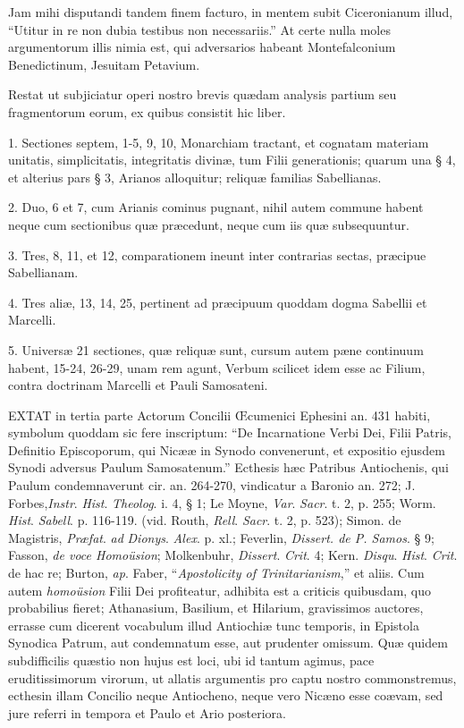 Jam mihi disputandi tandem
finem facturo, in mentem subit Ciceronianum illud, ``Utitur in re non
dubia testibus non necessariis.'' At certe nulla moles argumentorum
illis nimia est, qui adversarios habeant Montefalconium Benedictinum,
Jesuitam Petavium.

Restat
ut subjiciatur operi nostro brevis quædam analysis partium seu
fragmentorum eorum, ex quibus consistit hic liber.

1.
Sectiones septem, 1-5, 9, 10, Monarchiam tractant, et cognatam
materiam unitatis, simplicitatis, integritatis divinæ, tum Filii
generationis; quarum una § 4, et alterius pars § 3, Arianos
alloquitur; reliquæ familias Sabellianas.

2.
Duo, 6 et 7, cum Arianis cominus pugnant, nihil autem commune habent
neque cum sectionibus quæ præcedunt, neque cum iis quæ subsequuntur.

3.
Tres, 8, 11, et 12, comparationem ineunt inter contrarias sectas, præcipue
Sabellianam.

4.
Tres aliæ, 13, 14, 25, pertinent ad præcipuum quoddam dogma Sabellii
et Marcelli.

5.
Universæ 21 sectiones, quæ reliquæ sunt, cursum autem pæne
continuum habent, 15-24, 26-29, unam rem agunt, Verbum scilicet idem
esse ac Filium, contra doctrinam Marcelli et Pauli Samosateni.


EXTAT
in tertia parte Actorum Concilii Œcumenici Ephesini an. 431 habiti,
symbolum quoddam sic fere inscriptum: ``De Incarnatione Verbi Dei,
Filii Patris, Definitio Episcoporum, qui Nicææ in Synodo convenerunt,
et expositio ejusdem Synodi adversus Paulum Samosatenum.'' Ecthesis hæc
Patribus Antiochenis, qui Paulum condemnaverunt cir. an. 264-270,
vindicatur a Baronio an. 272; J. Forbes,\emph{Instr}. \emph{Hist}. \emph{Theolog}.
i. 4, § 1; Le Moyne, \emph{Var}. \emph{Sacr}. t. 2, p. 255; Worm. \emph{Hist}.
\emph{Sabell}. p. 116-119. (vid. Routh, \emph{Rell}. \emph{Sacr}. t.
2, p. 523); Simon. de Magistris, \emph{Præfat}. \emph{ad} \emph{Dionys}.
\emph{Alex}. p. xl.; Feverlin, \emph{Dissert. de P. Samos}. §
9; Fasson, \emph{de voce Homoüsion}; Molkenbuhr, \emph{Dissert}. \emph{Crit}.
4; Kern. \emph{Disqu}. \emph{Hist}. \emph{Crit}. de hac re; Burton, \emph{ap}.
Faber, ``\emph{Apostolicity of Trinitarianism},'' et aliis. Cum autem \emph{homoüsion}
Filii Dei profiteatur, adhibita est a criticis quibusdam, quo
probabilius fieret; Athanasium, Basilium, et Hilarium, gravissimos
auctores, errasse cum dicerent vocabulum illud Antiochiæ tunc
temporis, in Epistola Synodica Patrum, aut condemnatum esse, aut
prudenter omissum. Quæ quidem subdifficilis quæstio non hujus est
loci, ubi id tantum agimus, pace eruditissimorum virorum, ut allatis
argumentis pro captu nostro commonstremus, ecthesin illam Concilio
neque Antiocheno, neque vero Nicæno esse coævam, sed jure referri in
tempora et Paulo et Ario posteriora.

